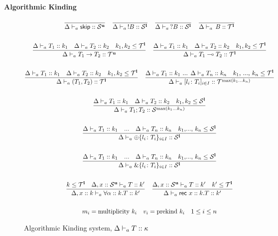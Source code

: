 \documentclass[12pt,openright,twoside]{report}
\begin{document}
	\begin{center}
		\textbf{Algorithmic Kinding}
	\end{center}

\begin{figure}[ht]
\centering
  \begin{gather*}
	\frac{}{\Delta \vdash_{a} \mathsf{skip} :: \mathcal S^{\mathbf{u}}} \quad
	\frac{}{\Delta \vdash_{a} \,!B :: \mathcal S^{\mathbf{l}}} \quad 
	\frac{}{\Delta \vdash_{a} \,?B :: \mathcal S^{\mathbf{l}}} \quad
	\frac{}{\Delta \vdash_{a} \,B :: \mathcal T^{\mathbf{l}}}	
    \\\\
    \frac{\Delta \vdash_{a} T_1 :: k_1 \quad \Delta \vdash_{a} T_2 :: k_2 \quad k_1, k_2 \le \mathcal T^{\mathbf{l}}}
    	{\Delta \vdash_{a} T_1 \to T_2 :: \mathcal T^{\mathbf{u}}}	
	\quad
    \frac{\Delta \vdash_{a} T_1 :: k_1 \quad \Delta \vdash_{a} T_2 :: k_2 \quad k_1, k_2 \le \mathcal T^{\mathbf{l}}}
    	{\Delta \vdash_{a} T_1 \multimap T_2 :: \mathcal T^{\mathbf{l}}}	
    \\\\
    \frac{\Delta \vdash_{a} T_1 :: k_1 \quad \Delta \vdash_{a} T_2 :: k_2 \quad k_1, k_2 \le \mathcal T^{\mathbf{l}}}
    	{\Delta \vdash_{a} (T_1,T_2) :: \mathcal T^{\mathbf{l}}}	
	\quad
    \frac{\Delta \vdash_{a} T_1 :: k_1 \mbox{ ... } \Delta \vdash_{a} T_n :: k_n \quad k_1\mbox{, ..., } k_n \le \mathcal T^{\mathbf{l}}}
    	{\Delta \vdash_{a} [l_i\colon T_i]_{i\in I} :: \mathcal T^{\max(k_1 ... k_n)}}	
	\\\\
	\frac{\Delta \vdash_{a} T_1 :: k_1 \quad \Delta \vdash_{a} T_2 :: k_2 \quad k_1, k_2 \le \mathcal S^{\mathbf{l}}}
    	{\Delta \vdash_{a} T_1;T_2 :: \mathcal S^{\max(k_1 ... k_n)}}	    
	\\\\
		\frac{\Delta \vdash_{a} T_1 :: k_1 \quad \mbox{...} \quad \Delta \vdash_{a} T_n :: k_n \quad k_1\mbox{,..., }k_n \le \mathcal S^{\mathbf{l}}}{
      \Delta \vdash_{a} \oplus\{l_i\colon T_i\}_{i\in I} :: \mathcal S^{\mathbf{l}}}
    \\\\
    \frac{\Delta \vdash_{a} T_1 :: k_1 \quad \mbox{...} \quad \Delta \vdash_{a} T_n :: k_n \quad k_1\mbox{,..., }k_n \le \mathcal S^{\mathbf{l}}}
    { \Delta \vdash_{a} \&\{l_i\colon T_i\}_{i\in I} :: \mathcal S^{\mathbf{l}}}
	\\\\
	 \frac{k \le \mathcal T^{\mathbf{l}} \quad \Delta, x :: \mathcal S^{\mathbf{u}} \vdash_{a} T :: k'}{\Delta, x :: k \vdash_{a} \forall \alpha :: k.T :: k'}
	\quad
	\frac{\Delta, x :: \mathcal S^{\mathbf{u}} \vdash_{a} T :: k' \quad k' \le \mathcal T^{\mathbf{l}}}{\Delta \vdash_{a} \mathsf{rec} \mbox{ } x :: k.T :: k'}
	 \\\\
	m_i = \mbox{multiplicity } k_i \quad v_i = \mbox{prekind } k_i \quad 1 \le i \le n 
	\end{gather*}
  \caption{Algorithmic Kinding system, $\Delta \vdash_{a} T :: \kappa$}
  \label{fig:kinding}
\end{figure}
 
%



\end{document}
